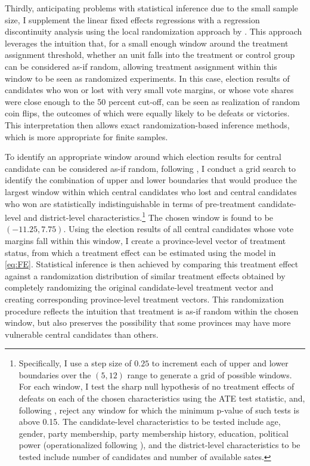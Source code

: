 \documentclass[12pt]{article}\usepackage[]{graphicx}\usepackage[]{color}
\newcommand{\1}{\mathbbm{1}}
\begin{document}
Thirdly, anticipating problems with statistical inference due to the small sample size, I supplement the linear fixed effects regressions with a regression discontinuity analysis using the local randomization approach by \citep{CattaneoTitiunik2015}. This approach leverages the intuition that, for a small enough window around the treatment assignment threshold, whether an unit falls into the treatment or control group can be considered as-if random, allowing treatment assignment within this window to be seen as randomized experiments. In this case, election results of candidates who won or lost with very small vote margins, or whose vote shares were close enough to the 50 percent cut-off, can be seen as realization of random coin flips, the outcomes of which were equally likely to be defeats or victories. This interpretation then allows exact randomization-based inference methods, which is more appropriate for finite samples.

To identify an appropriate window around which election results for central candidate can be considered as-if random, following \citet{CattaneoTitiunik2015}, I conduct a grid search to identify the combination of upper and lower boundaries that would produce the largest window within which central candidates who lost and central candidates who won are statistically indistinguishable in terms of pre-treatment candidate-level and district-level characteristics.\footnote{Specifically, I use a step size of $0.25$ to increment each of upper and lower boundaries over the $(5, 12)$ range to generate a grid of possible windows. For each window, I test the sharp null hypothesis of no treatment effects of defeats on each of the chosen characteristics using the ATE test statistic, and, following \citet{CattaneoTitiunik2015}, reject any window for which the minimum p-value of such tests is above 0.15. The candidate-level characteristics to be tested include age, gender, party membership, party membership history, education, political power (operationalized following \citet{MaleskySchuler2011}), and the district-level characteristics to be tested include number of candidates and number of available sates.} The chosen window is found to be $(-11.25, 7.75)$. Using the election results of all central candidates whose vote margins fall within this window, I create a province-level vector of treatment status, from which a treatment effect can be estimated using the model in \ref{eq:FE}. Statistical inference is then achieved by comparing this treatment effect against a randomization distribution of similar treatment effects obtained by completely randomizing the original candidate-level treatment vector and creating corresponding province-level treatment vectors. This randomization procedure reflects the intuition that treatment is as-if random within the chosen window, but also preserves the possibility that some provinces may have more vulnerable central candidates than others.
\end{document}
